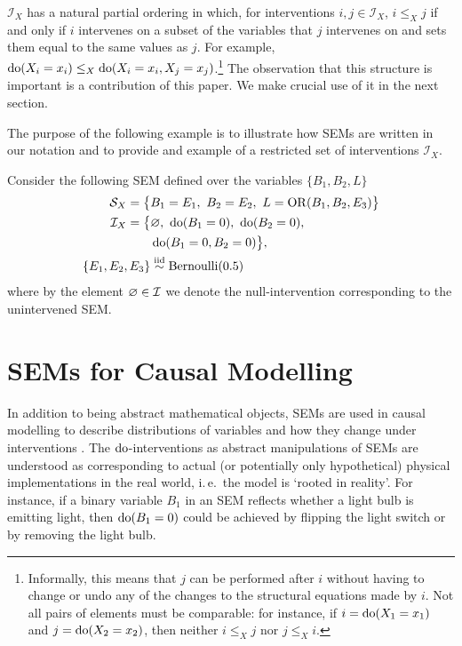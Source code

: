 $\mathcal{I}_X$ has a natural partial ordering in which, for interventions ${i, j \in \mathcal{I}_X}$, ${i\leq_X j}$ if and only if $i$ intervenes on a subset of the variables that $j$ intervenes on and sets them equal to the same values as $j$.
For example, ${\operatorname{do}(X_i=x_i) \leq_X \operatorname{do}(X_i=x_i, X_j=x_j)}$.\footnote{Informally, this means that $j$ can be performed after $i$ without having to change or undo any of the changes to the structural equations made by $i$.
Not all pairs of elements must be comparable: for instance, if $i= \operatorname{do}(X_1=x_1)$ and $j = \operatorname{do}(X_2=x_2)$, then neither $i\leq_X j$ nor $j \leq_X i$.} The observation that this structure is important is a contribution of this paper. We make crucial use of it in the next section.

The purpose of the following example is to illustrate how SEMs are written in our notation and to provide and example of a restricted set of interventions $\mathcal{I}_X$.

\begin{example}\label{example1}
Consider the following SEM defined over the variables $\{ B_1,B_2,L \}$
%
\begin{align*}
\mathcal{S}_X = \big\{ & B_1 = E_1,\ B_2 = E_2,\ L = \operatorname{OR}(B_1,B_2,E_3) \big\} \\
%
\mathcal{I}_X = \big\{ & \nulli,\ \doop(B_1=0),\ \doop(B_2=0),\\
& \doop(B_1=0,B_2=0) \big\}, \\
%
\{ E_1,E_2,E_3 \} & \overset{\text{iid}}{\sim} \mathrm{Bernoulli}(0.5)
\end{align*}
%
where by the element $\varnothing \in \mathcal{I}$ we denote the null-intervention corresponding to the unintervened SEM\@.
\end{example}

\section{SEMs for Causal Modelling}\label{sec:sem-for-causal-modelling}

In addition to being abstract mathematical objects, SEMs are used in causal modelling to describe distributions of variables and how they change under interventions \citep{pearl2009causality}.
The $\operatorname{do}$-interventions as abstract manipulations of SEMs are understood as corresponding to actual (or potentially only hypothetical) physical implementations in the real world, i.\,e.\ the model is `rooted in reality'.
For instance, if a binary variable $B_1$ in an SEM reflects whether a light bulb is emitting light, then $\operatorname{do}(B_1=0)$ could be achieved by flipping the light switch or by removing the light bulb.

